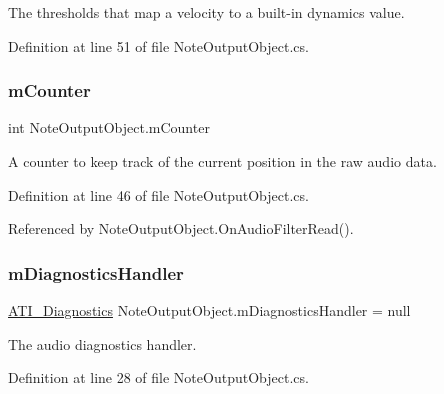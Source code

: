 The thresholds that map a velocity to a built-\/in dynamics value. 



Definition at line 51 of file Note\+Output\+Object.\+cs.

\mbox{\label{group___n_o_o_priv_var_ga5dca97be8d58837ace4ea6f4a972b20a}} 
\subsubsection{\texorpdfstring{m\+Counter}{mCounter}}
{\footnotesize\ttfamily int Note\+Output\+Object.\+m\+Counter\hspace{0.3cm}{\ttfamily [private]}}



A counter to keep track of the current position in the raw audio data. 



Definition at line 46 of file Note\+Output\+Object.\+cs.



Referenced by Note\+Output\+Object.\+On\+Audio\+Filter\+Read().

\mbox{\label{group___n_o_o_priv_var_gacd4376d2314caafc831cc049e9ca58d8}} 
\subsubsection{\texorpdfstring{m\+Diagnostics\+Handler}{mDiagnosticsHandler}}
{\footnotesize\ttfamily \hyperlink{group___audio_testing_class_a_t_i___diagnostics}{A\+T\+I\+\_\+\+Diagnostics} Note\+Output\+Object.\+m\+Diagnostics\+Handler = null\hspace{0.3cm}{\ttfamily [private]}}



The audio diagnostics handler. 



Definition at line 28 of file Note\+Output\+Object.\+cs.

\mbox{\label{group___n_o_o_priv_var_gaf0c9c2a90b5d73b8ffa0906bc69acdbc}} 
